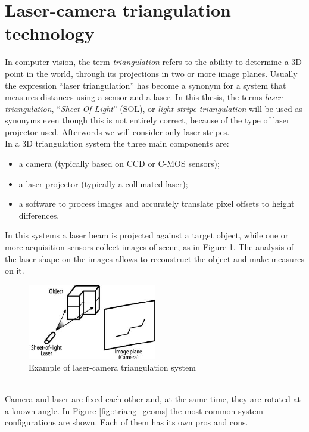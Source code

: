 \section{Laser-camera triangulation technology}
\label{sec:lctt}
In computer vision, the term \textit{triangulation} refers to the ability to determine a 3D point in the world, through its projections in two or more image planes. Usually the expression ``laser triangulation'' has become a synonym for a system that measures distances using a sensor and a laser. In this thesis, the terms \textit{laser triangulation}, ``\textit{Sheet Of Light}'' (\acs{SOL}), or \textit{light stripe triangulation} will be used as synonyms even though this is not entirely correct, because of the type of laser projector used. Afterwords we will consider only laser stripes. \\

In a 3D triangulation system the three main components are:
\begin{itemize}
  \item a camera (typically based on CCD or C-MOS sensors);
  \item a laser projector (typically a collimated laser);
  \item a software to process images and accurately translate pixel offsets to height differences.
\end{itemize}
In this systems a laser beam is projected against a target object, while one or more acquisition sensors collect images of scene, as in Figure \ref{fig::triang_config}. The analysis of the laser shape on the images allows to reconstruct the object and make measures on it.
\begin{figure}[t!]
  \centering
  \includegraphics[width=0.5\textwidth]{./images/tech/triang_model_2.png}
  \caption{Example of laser-camera triangulation system}
  \label{fig::triang_config}
\end{figure} \\
Camera and laser are fixed each other and, at the same time, they are rotated at a known angle. In Figure \ref{fig::triang_geoms} the most common system configurations are shown. Each of them has its own pros and cons. \\

